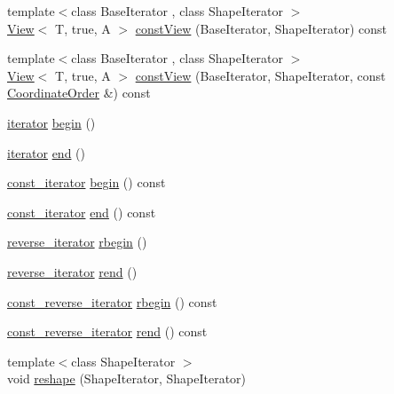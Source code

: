 \begin{DoxyCompactItemize}
\item 
{\footnotesize template$<$class Base\+Iterator , class Shape\+Iterator $>$ }\\\hyperlink{classandres_1_1View}{View}$<$ T, true, A $>$ \hyperlink{classandres_1_1View_af21d465bc9e3b1cd99cc959b193fc02a}{const\+View} (Base\+Iterator, Shape\+Iterator) const
\item 
{\footnotesize template$<$class Base\+Iterator , class Shape\+Iterator $>$ }\\\hyperlink{classandres_1_1View}{View}$<$ T, true, A $>$ \hyperlink{classandres_1_1View_a2b62323500d25777e435c377a586a68a}{const\+View} (Base\+Iterator, Shape\+Iterator, const \hyperlink{namespaceandres_a2ac8b7aa89d44e8188a7c0ba50f4306b}{Coordinate\+Order} \&) const
\item 
\hyperlink{classandres_1_1View_aef54ee0a58e755b897398493d05a44df}{iterator} \hyperlink{classandres_1_1View_acd1f71e27ea01d536e1539877afedfa9}{begin} ()
\item 
\hyperlink{classandres_1_1View_aef54ee0a58e755b897398493d05a44df}{iterator} \hyperlink{classandres_1_1View_af778a1e9839f2f90e503514e36d41b78}{end} ()
\item 
\hyperlink{classandres_1_1View_a7b6f125a7b3830f30cd34887b61858a7}{const\+\_\+iterator} \hyperlink{classandres_1_1View_a87da961e49db2ffdcdf412275b935121}{begin} () const
\item 
\hyperlink{classandres_1_1View_a7b6f125a7b3830f30cd34887b61858a7}{const\+\_\+iterator} \hyperlink{classandres_1_1View_addbf9af2a1a8cce107881ffbfe0e84ca}{end} () const
\item 
\hyperlink{classandres_1_1View_aab07af42756759420211d114bb705547}{reverse\+\_\+iterator} \hyperlink{classandres_1_1View_a035fa9d7c83683bfbfb9141251336ba5}{rbegin} ()
\item 
\hyperlink{classandres_1_1View_aab07af42756759420211d114bb705547}{reverse\+\_\+iterator} \hyperlink{classandres_1_1View_a27d6bad469c2e4590e0fa9f00108c36e}{rend} ()
\item 
\hyperlink{classandres_1_1View_a61656971b73a48c8bf009e3200aad900}{const\+\_\+reverse\+\_\+iterator} \hyperlink{classandres_1_1View_aab9bb48b2bb31d78aab476a197055538}{rbegin} () const
\item 
\hyperlink{classandres_1_1View_a61656971b73a48c8bf009e3200aad900}{const\+\_\+reverse\+\_\+iterator} \hyperlink{classandres_1_1View_aa1e69b1fadf6ed6b73802cf0e01e3254}{rend} () const
\item 
{\footnotesize template$<$class Shape\+Iterator $>$ }\\void \hyperlink{classandres_1_1View_a7d0432d097b8ce03a413006ec2fe9469}{reshape} (Shape\+Iterator, Shape\+Iterator)

\end{DoxyCompactItemize}
